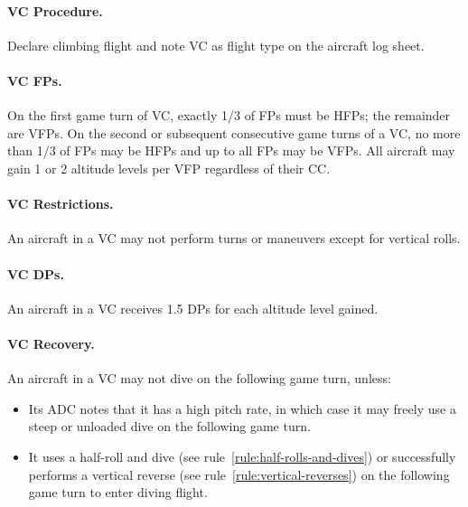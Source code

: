 {\paragraph{VC Procedure.} Declare climbing flight and note VC as flight type on the aircraft log sheet. 

\paragraph{VC FPs.} On the first game turn of VC, exactly 1/3 of FPs must be HFPs; the remainder are VFPs. On the second or subsequent consecutive game turns of a VC, no more than 1/3 of FPs may be HFPs and up to all FPs may be VFPs. All aircraft may gain 1 or 2 altitude levels per VFP regardless of their CC.

\paragraph{VC Restrictions.} An aircraft in a VC may not perform turns or maneuvers except for vertical rolls. 

\paragraph{VC DPs.} An aircraft in a VC receives 1.5 DPs for each altitude level gained.

\paragraph{VC Recovery.} An aircraft in a VC may not dive on the following game turn, unless:

\begin{itemize}

    \item Its ADC notes that it has a high pitch rate, in which case it may freely use a steep or unloaded dive on the following game turn.

    \item It uses a half-roll and dive (see rule~\ref{rule:half-rolls-and-dives}) or successfully performs a vertical reverse (see rule~\ref{rule:vertical-reverses}) on the following game turn to enter diving flight.
    
\end{itemize}
}


